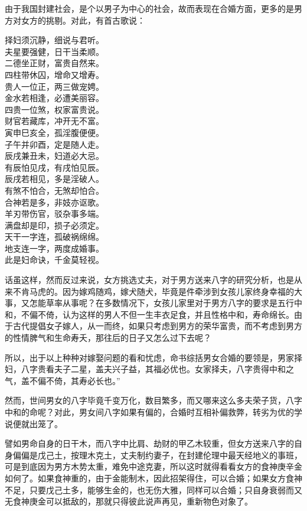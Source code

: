 \documentclass[a5paper,oneside,12pt]{ctexbook}
\newenvironment{tightcenter}{%
  \setlength\topsep{0pt}
  \setlength\parskip{0pt}
  \begin{center}\kaishu 
}{%
  \end{center}
}
\begin{document}
由于我国封建社会，是个以男子为中心的社会，故而表现在合婚方面，更多的是男方对女方的挑剔。对此，有首古歌说：
\begin{tightcenter}
择妇须沉静，细说与君听。\\
夫星要强健，日干当柔顺。\\
二德坐正财，富贵自然来。\\
四柱带休囚，增命又增寿。\\
贵人一位正，两三做宠娉。\\
金水若相逢，必遭美丽容。\\
四贵一位煞，权家富贵说。\\
财官若藏库，冲开无不富。\\
寅申巳亥全，孤淫腹便便。\\
子午并卯酉，定是随人走。\\
辰戌兼丑未，妇道必大忌。\\
有辰怕见戌，有戌怕见辰。\\
辰戌若相见，多是淫破人。\\
有煞不怕合，无煞却怕合。\\
合神若是多，非妓亦讴歌。\\
羊刃带伤官，驳杂事多端。\\
满盘却是印，损子必须定。\\
天干一字连，孤破祸绵绵。\\
地支连一字，两度成婚事。\\
此是妇命诀，千金莫轻视。\\ 
\end{tightcenter}

话虽这样，然而反过来说，女方挑选丈夫，对于男方送来八字的研究分析，也是从来不肯马虎的。因为嫁鸡随鸡，嫁犬随犬，毕竟是件牵涉到女孩儿家终身幸福的大事，又怎能草率从事呢？在多数情况下，女孩儿家里对于男方八字的要求是五行中和，不偏不倚，认为这样的男人不但一生丰衣足食，并且性格中和，寿命绵长。由于古代提倡女子嫁人，从一而终，如果只考虑到男方的荣华富贵，而不考虑到男方的性情脾气和生命寿夭，那往后的日子又怎么过下去呢？

所以，出于以上种种对嫁娶问题的看和忧虑，命书综括男女合婚的要领是，男家择妇，八字贵看夫子二星，盖夫兴子益，其福必优也。女家择夫，八字贵得中和之气，盖不偏不倚，其寿必长也。”

然而，世间男女的八字毕竟千变万化，数目繁多，而又哪来这么多夫荣子货，八字中和的命呢？对此，男女间八字如果有偏的，合婚时互相补偏救弊，转劣为优的学说便就出笼了。

譬如男命自身的日干木，而八字中比肩、劫财的甲乙木较重，但女方送来八字的自身偏偏是戊己土，按理木克土，丈夫制约妻子，在封建伦理中最天经地义的事班，可是到底因为男方木势太重，难免中途克妻，所以这时就得看看女方的食神庚辛金如何了。如果食神重的，由于金能制木，因此招架得住，可以合婚；如果女方食神不足，只要戊己土多，能够生金的，也无伤大雅，同样可以合婚；只自身衰弱而又无食神庚金可以抵敌的，那就只得彼此说声再见，重新物色对象了。
\end{document}
